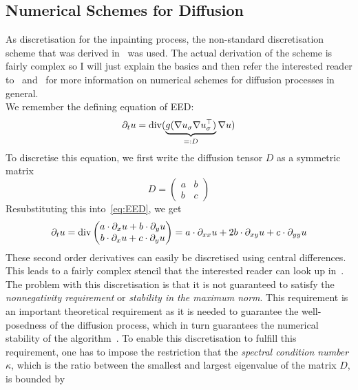 \subsection{Numerical Schemes for Diffusion}\label{sub:NumSchemesDiffusion}
As discretisation for the inpainting process, the non-standard discretisation scheme that was
derived in~\cite{www13} was used. The actual derivation of the scheme is fairly complex so I will
just explain the basics and then refer the interested reader to~\cite{www13} and~\cite{weickert96}
for more information on numerical schemes for diffusion processes in general.\\
We remember the defining equation of EED\@:
\begin{equation}
    \partial_t u = \operatorname{div}(\underbrace{g(\mathbf{\nabla} u_\sigma\mathbf{\nabla} u_\sigma^\top)}_{=:D}\mathbf{\nabla}
    u)\label{eq:EED}
\end{equation}
To discretise this equation, we first write the diffusion tensor $D$ as a symmetric matrix
\begin{equation}
    D = \begin{pmatrix}
        a&b\\b&c
    \end{pmatrix}
\end{equation}
Resubstituting this into~\eqref{eq:EED}, we get 
\begin{equation}
\partial_t u = \operatorname{div} \begin{pmatrix}
    a\cdot \partial_x u+b\cdot \partial_y u\\
    b\cdot \partial_x u+c\cdot \partial_y u
\end{pmatrix} = a\cdot\partial_{xx} u + 2b\cdot \partial_{xy}u+ c\cdot \partial_{yy} u
\end{equation}
These second order derivatives can easily be discretised using central differences. This leads to a
fairly complex stencil that the interested reader can look up in~\cite{weickert96}.
The problem with this discretisation is that it is not guaranteed to satisfy the
\textit{nonnegativity requirement} or \textit{stability in the maximum norm}\cite{weickert96}. This requirement is
an important theoretical requirement as it is needed to guarantee the well-posedness of the
diffusion process, which in turn guarantees the numerical stability of the
algorithm~\cite{weickert96}.
To enable this discretisation to fulfill this requirement, one has to impose the restriction that
the \textit{spectral condition number $\kappa$}, which is the ratio between the smallest and
largest eigenvalue of the matrix $D$, is bounded by 
